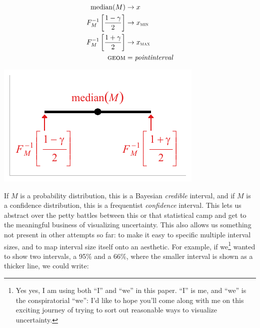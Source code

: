 \documentclass[journal]{vgtc}                     %
\begin{document}
\noindent
\begin{minipage}{.5\columnwidth}
\begin{align*}
\operatorname{median}(M) &\rightarrow x\\
F_M^{-1}\left[\frac{1 - \gamma}{2}\right] &\rightarrow x_\textsc{min}\\
F_M^{-1}\left[\frac{1 + \gamma}{2}\right] &\rightarrow x_\textsc{max}\\
\textsc{geom} &= \mathit{pointinterval}
\end{align*}
\end{minipage}%
  \begin{minipage}{.4\columnwidth}
    \centering
    \includegraphics[width=1.2\columnwidth]{figs/3-geom_pointinterval_quantiles.pdf}
  \end{minipage}
\hfill\break

If $M$ is a probability distribution, this is a Bayesian \textit{credible }interval, and if $M$ is a confidence distribution, this is a frequentist \textit{confidence} interval. This lets us abstract over the petty battles between this or that statistical camp and get to the meaningful business of visualizing uncertainty. This also allows us something not present in other attempts so far: to make it easy to specific multiple interval sizes, and to map interval size itself onto an aesthetic. For example, if we\footnote{Yes yes, I am using both ``I'' and ``we'' in this paper. ``I'' is me, and ``we'' is the conspiratorial ``we'': I'd like to hope you'll come along with me on this exciting journey of trying to sort out reasonable ways to visualize uncertainty.} wanted to show two intervals, a 95\% and a 66\%, where the smaller interval is shown as a thicker line, we could write:
\end{document}
